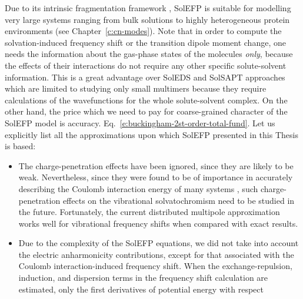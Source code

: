 \documentclass[b5paper,oneside,fleqn,11pt]{book}
\begin{document}
\begin{refsection}
Due to its intrinsic fragmentation framework \citep{Gordon.Fedorov.Pruitt.Slipchenko.ChemRev.2012}, 
SolEFP is suitable for modelling very large systems
ranging from bulk solutions to highly heterogeneous
protein environments \citep{Blasiak.Ritchie.Webb.Cho.PCCP.2016} 
(see Chapter~\ref{c:cn-modes}). Note that in order
to compute the solvation\hyp{}induced frequency shift or the
transition dipole moment change, one needs the information
about the gas\hyp{}phase states of the molecules \emph{only}, 
because the effects of their interactions do not require 
any other specific solute\hyp{}solvent information.
This is a great advantage over SolEDS and SolSAPT approaches
which are limited to studying only small multimers because 
they require calculations of the wavefunctions for the whole
solute\hyp{}solvent complex. On the other hand, the price
which we need to pay for coarse\hyp{}grained character of the SolEFP model
is accuracy.
Eq.~\eqref{e:buckingham-2st-order-total-fund}. 
Let us 
explicitly list all the approximations upon which SolEFP presented in 
this Thesis is based:
%
\begin{itemize}
 \item The charge\hyp{}penetration effects have been ignored, since they are likely to be weak. 
Nevertheless, since they were found to be of importance in accurately describing 
the Coulomb interaction energy of many systems \citep{Slipchenko.Gordon.JCC.2007}, 
such charge\hyp{}penetration 
effects on the vibrational solvatochromism need to be studied in the future. Fortunately,
the current distributed multipole approximation works well for vibrational frequency shifts
when compared with exact results. \citep{Blasiak.Cho.JCP.2014,Blasiak.Cho.JCP.2015,
Blasiak.Ritchie.Webb.Cho.PCCP.2016,Maj.Ahn.Blasiak.Kwak.Han.Cho.XXX.2016}
 \item Due to the complexity of the SolEFP equations, we did not take into account the electric 
anharmonicity contributions, except for that associated with the Coulomb interaction\hyp{}induced 
frequency shift. When the exchange\hyp{}repulsion, induction, and dispersion terms in the frequency 
shift calculation are estimated, only the first derivatives of potential energy with respect 

\end{itemize}
\end{refsection}
\end{document}

